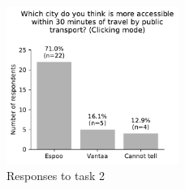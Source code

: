\begin{appendices}
\begin{figure}[H]
	\centering
	\includegraphics[width=0.5\textwidth]{visual/figures/survey/2.pdf}
	\caption{Responses to task 2}
	\label{fig:task 2}
\end{figure}


\end{appendices}
